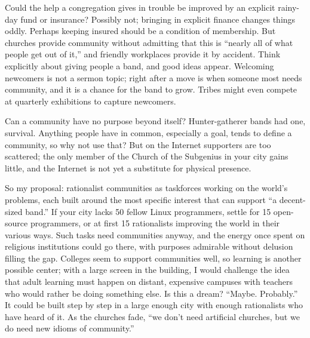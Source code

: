 Could the help a congregation gives in trouble be improved by an explicit rainy-day fund or insurance? Possibly not; bringing in explicit finance changes things oddly. Perhaps keeping insured should be a condition of membership. But churches provide community without admitting that this is ``nearly all of what people get out of it,'' and friendly workplaces provide it by accident. Think explicitly about giving people a band, and good ideas appear. Welcoming newcomers is not a sermon topic; right after a move is when someone most needs community, and it is a chance for the band to grow. Tribes might even compete at quarterly exhibitions to capture newcomers. 

Can a community have no purpose beyond itself? Hunter-gatherer bands had one, survival. Anything people have in common, especially a goal, tends to define a community, so why not use that? But on the Internet supporters are too scattered; the only member of the Church of the Subgenius in your city gains little, and the Internet is not yet a substitute for physical presence. 

So my proposal: rationalist communities as taskforces working on the world's problems, each built around the most specific interest that can support ``a decent-sized band.'' If your city lacks 50 fellow Linux programmers, settle for 15 open-source programmers, or at first 15 rationalists improving the world in their various ways. Such tasks need communities anyway, and the energy once spent on religious institutions could go there, with purposes admirable without delusion filling the gap. Colleges seem to support communities well, so learning is another possible center; with a large screen in the building, I would challenge the idea that adult learning must happen on distant, expensive campuses with teachers who would rather be doing something else. Is this a dream? ``Maybe. Probably.'' It could be built step by step in a large enough city with enough rationalists who have heard of it. As the churches fade, ``we don't need artificial churches, but we do need new idioms of community.''
